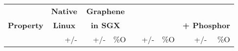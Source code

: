 \begin{table}[t!b!]
	\footnotesize
	\centering
	\tabcolsep=0.09cm
	\begin{tabular}{|l|rr|rrr|rrr|rrr|}
		\hline
		{} & \multicolumn{2}{|c|}{{\bf Native}} &  \multicolumn{3}{|c|}{{\bf Graphene
			}} &
			\multicolumn{3}{|c|}{{\bf 
				}} &
				\multicolumn{3}{|c|}{{\bf \sysname{}
					}} \\
		{\bf Property } & \multicolumn{2}{|c|}{{\bf Linux}} &  \multicolumn{3}{|c|}{{\bf in SGX
			}} &
			\multicolumn{3}{|c|}{{\bf \sysname{}
				}} &
				\multicolumn{3}{|c|}{{\bf + Phosphor
					}} \\
				
				&  & {\footnotesize +/-} &  & {\footnotesize +/-} & \%O&  &  {\footnotesize +/-} & \%O&  & {\footnotesize +/-} & \%O\\

				

\end{tabular}
\end{table}
